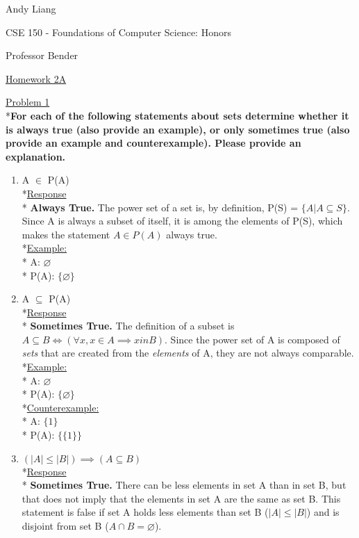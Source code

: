 \documentclass[12pt]{article}
\begin{document}
\begin{flushleft}
Andy Liang

CSE 150 - Foundations of Computer Science: Honors

Professor Bender
\end{flushleft}
\medskip
\centerline{\uline{Homework 2A}}
\bigskip\bigskip

\noindent
\uline{Problem 1}
\\*\textbf{For each of the following statements about sets determine whether it is always true (also provide an example), or only sometimes true (also provide an example and counterexample). Please provide an explanation.}
\begin{enumerate}
\item A $\in$ P(A)
\smallskip
\\*\uline{Response}
\\* \textbf{Always True.} The power set of a set is, by definition, P(S) = $\{A | A \subseteq S\}$. Since A is always a subset of itself, it is among the elements of P(S), which makes the statement $A \in P(A)$ always true. 
\\*\uline{Example:}
\\* A: $\varnothing$
\\* P(A): $\{\varnothing\}$
\smallskip
\item A $\subseteq$ P(A)
\smallskip
\\*\uline{Response}
\\* \textbf{Sometimes True.} The definition of a subset is $A \subseteq B \iff (\forall x, x \in A \implies x in B).$ Since the power set of A is composed of \textit{sets} that are created from the \textit{elements} of A, they are not always comparable. 
\\*\uline{Example:}
\\* A: $\varnothing$
\\* P(A): $\{\varnothing\}$
\\*\uline{Counterexample:}
\\* A: $\{1\}$
\\* P(A): $\{ \{1\} \}$
\smallskip
\item $(|A| \leq |B|) \implies (A \subseteq B)$
\smallskip
\\*\uline{Response}
\\* \textbf{Sometimes True.} There can be less elements in set A than in set B, but that does not imply that the elements in set A are the same as set B. This statement is false if set A holds less elements than set B ($|A| \leq |B|$) and is disjoint from set B ($A \cap B = \varnothing$).

\end{enumerate}
\end{document}
